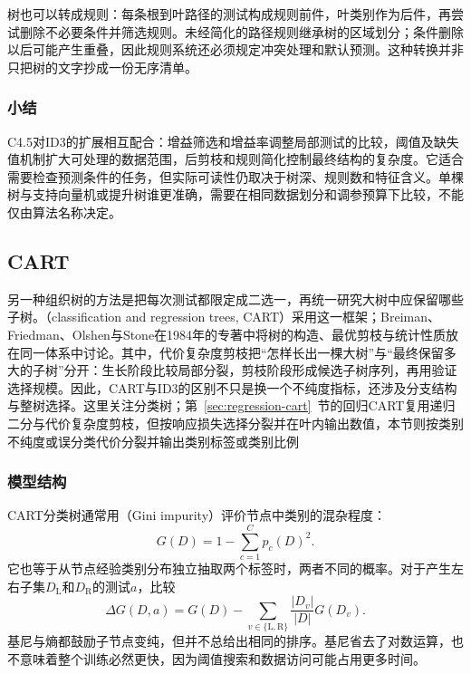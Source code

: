 树也可以转成规则：每条根到叶路径的测试构成规则前件，叶类别作为后件，再尝试删除不必要条件并筛选规则。未经简化的路径规则继承树的区域划分；条件删除以后可能产生重叠，因此规则系统还必须规定冲突处理和默认预测。这种转换并非只把树的文字抄成一份无序清单。

\subsubsection{小结}
\label{sec:classification-c45-summary}

C4.5对ID3的扩展相互配合：增益筛选和增益率调整局部测试的比较，阈值及缺失值机制扩大可处理的数据范围，后剪枝和规则简化控制最终结构的复杂度。它适合需要检查预测条件的任务，但实际可读性仍取决于树深、规则数和特征含义。单棵树与支持向量机或提升树谁更准确，需要在相同数据划分和调参预算下比较，不能仅由算法名称决定。

\subsection{CART}
\label{sec:classification-cart}

另一种组织树的方法是把每次测试都限定成二选一，再统一研究大树中应保留哪些子树。（classification and regression trees, CART）采用这一框架；Breiman、Friedman、Olshen与Stone在1984年的专著中将树的构造、最优剪枝与统计性质放在同一体系中讨论。其中，代价复杂度剪枝把“怎样长出一棵大树”与“最终保留多大的子树”分开：生长阶段比较局部分裂，剪枝阶段形成候选子树序列，再用验证选择规模。因此，CART与ID3的区别不只是换一个不纯度指标，还涉及分支结构与整树选择。这里关注分类树；第~\ref{sec:regression-cart}~节的回归CART复用递归二分与代价复杂度剪枝，但按响应损失选择分裂并在叶内输出数值，本节则按类别不纯度或误分类代价分裂并输出类别标签或类别比例

\subsubsection{模型结构}
\label{sec:classification-cart-structure}

CART分类树通常用（Gini impurity）评价节点中类别的混杂程度：
\begin{equation}
  G(D)=1-\sum_{c=1}^{C}p_c(D)^2.
  \label{eq:classification-gini}
\end{equation}
它也等于从节点经验类别分布独立抽取两个标签时，两者不同的概率。对于产生左右子集$D_{\mathrm{L}}$和$D_{\mathrm{R}}$的测试$a$，比较
\begin{equation}
  \Delta G(D,a)=G(D)
  -\sum_{v\in\{\mathrm{L},\mathrm{R}\}}
  \frac{|D_v|}{|D|}G(D_v).
  \label{eq:classification-gini-decrease}
\end{equation}
基尼与熵都鼓励子节点变纯，但并不总给出相同的排序。基尼省去了对数运算，也不意味着整个训练必然更快，因为阈值搜索和数据访问可能占用更多时间。

